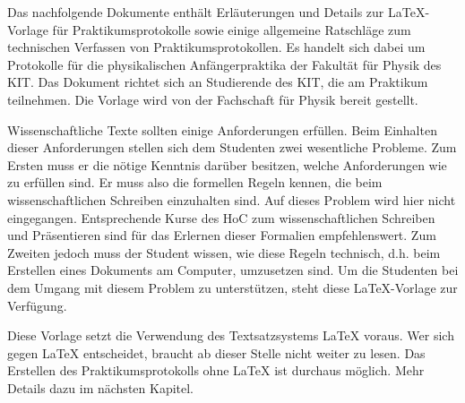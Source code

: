 Das nachfolgende Dokumente enthält Erläuterungen und Details zur LaTeX-Vorlage für Praktikumsprotokolle sowie einige allgemeine Ratschläge zum technischen Verfassen von Praktikumsprotokollen. Es handelt sich dabei um Protokolle für die physikalischen Anfängerpraktika der Fakultät für Physik des KIT. Das Dokument richtet sich an Studierende des KIT, die am Praktikum teilnehmen. Die Vorlage wird von der Fachschaft für Physik bereit gestellt.

Wissenschaftliche Texte sollten einige Anforderungen erfüllen. Beim Einhalten dieser Anforderungen stellen sich dem Studenten zwei wesentliche Probleme. Zum Ersten muss er die nötige Kenntnis darüber besitzen, welche Anforderungen wie zu erfüllen sind. Er muss also die formellen Regeln kennen, die beim wissenschaftlichen Schreiben einzuhalten sind. Auf dieses Problem wird hier nicht eingegangen. Entsprechende Kurse des HoC zum wissenschaftlichen Schreiben und Präsentieren sind für das Erlernen dieser Formalien empfehlenswert. Zum Zweiten jedoch muss der Student wissen, wie diese Regeln technisch, d.h. beim Erstellen eines Dokuments am Computer, umzusetzen sind. Um die Studenten bei dem Umgang mit diesem Problem zu unterstützen, steht diese LaTeX-Vorlage zur Verfügung.

Diese Vorlage setzt die Verwendung des Textsatzsystems LaTeX voraus. Wer sich gegen LaTeX entscheidet, braucht ab dieser Stelle nicht weiter zu lesen. Das Erstellen des Praktikumsprotokolls ohne LaTeX ist durchaus möglich. Mehr Details dazu im nächsten Kapitel.
